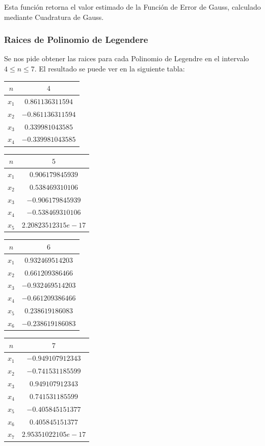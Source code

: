 \documentclass[12pt,letterpaper]{article}
\begin{document}
Esta función retorna el valor estimado de la Función de Error de Gauss, calculado mediante Cuadratura de Gauss.

\newpage
\subsubsection{Raices de Polinomio de Legendere}
Se nos pide obtener las raices para cada Polinomio de Legendre en el intervalo $4 \leq n \leq 7$. El resultado se puede ver en la siguiente tabla:

\begin{table}[!h]
\begin{tabular}{|c|c|}
\hline
$n$ & $4$ \\ \hline 
$x_1$ & $0.861136311594$ \\ \hline 
$x_2$ & $-0.861136311594$ \\ \hline 
$x_3$ & $0.339981043585$ \\ \hline 
$x_4$ & $-0.339981043585$ \\ \hline  
\end{tabular}
\begin{tabular}{|c|c|}
\hline
$n$ & $5$ \\ \hline 
$x_1$ & $0.906179845939$ \\ \hline 
$x_2$ & $0.538469310106$ \\ \hline 
$x_3$ & $-0.906179845939$ \\ \hline 
$x_4$ & $-0.538469310106$ \\ \hline 
$x_5$ & $2.20823512315e-17$ \\ \hline 
\end{tabular}
\begin{tabular}{|c|c|}
\hline
$n$ & $6$ \\ \hline 
$x_1$ & $0.932469514203$ \\ \hline 
$x_2$ & $0.661209386466$ \\ \hline 
$x_3$ & $-0.932469514203$ \\ \hline 
$x_4$ & $-0.661209386466$ \\ \hline 
$x_5$ & $0.238619186083$ \\ \hline 
$x_6$ & $-0.238619186083$ \\ \hline 
	\end{tabular}
\begin{tabular}{|c|c|}
\hline
$n$ & $7$ \\ \hline 
$x_1$ & $-0.949107912343$ \\ \hline 
$x_2$ & $-0.741531185599$ \\ \hline 
$x_3$ & $0.949107912343$ \\ \hline 
$x_4$ & $0.741531185599$ \\ \hline 
$x_5$ & $-0.405845151377$ \\ \hline 
$x_6$ & $0.405845151377$ \\ \hline 
$x_7$ & $2.95351022105e-17$ \\ \hline 
	\end{tabular}
\end{table}
\newpage
\end{document}
